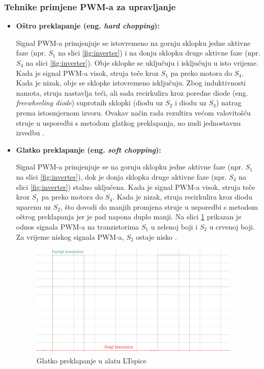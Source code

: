 \documentclass[diplomskirad]{fer}
\begin{document}
\subsubsection{Tehnike primjene PWM-a za upravljanje}
\label{sss:pwm}
\begin{itemize}

	\item \textbf{Oštro preklapanje (eng. \textit{hard chopping}):}

	      Signal PWM-a primjenjuje se istovremeno na gornju sklopku jedne aktivne faze
	      (npr. $S_1$ na slici \ref{fig:inverter}) i na donju sklopku druge aktivne faze
	      (npr. $S_4$ na slici \ref{fig:inverter}). Obje sklopke se uključuju i
	      isključuju u isto vrijeme. Kada je signal PWM-a visok, struja teče kroz $S_1$
	      pa preko motora do $S_4$. Kada je nizak, obje se sklopke istovremeno
	      isključuju. Zbog induktivnosti namota, struja nastavlja teći, ali sada
	      recirkulira kroz poredne diode (eng. \textit{freewheeling diode}) suprotnih
	      sklopki (diodu uz $S_2$ i diodu uz $S_3$) natrag prema istosmjernom izvoru.
	      Ovakav način rada rezultira većom valovitošću struje u usporedbi s metodom
	      glatkog preklapanja, no nudi jednostavnu izvedbu \cite{TI2015}.

	\item \textbf{Glatko preklapanje (eng. \textit{soft chopping}):}

	      Signal PWM-a primjenjuje se na gornju sklopku jedne aktivne faze (npr. $S_1$ na
	      slici \ref{fig:inverter}), dok je donja sklopka druge aktivne faze (npr. $S_4$
	      na slici \ref{fig:inverter}) stalno uključena. Kada je signal PWM-a visok,
	      struja teče kroz $S_1$ pa preko motora do $S_4$. Kada je nizak, struja
	      recirkulira kroz diodu uparenu uz $S_2$, što dovodi do manjih promjena struje u
	      usporedbi s metodom oštrog preklapanja jer je pad napona duplo manji. Na slici
	      \ref{fig:hard_chopping} prikazan je odnos signala PWM-a na tranzistorima $S_1$
	      u zelenoj boji i $S_2$ u crvenoj boji. Za vrijeme niskog signala PWM-a, $S_2$
	      ostaje nisko \cite{TI2015}. 
	      \begin{figure}[h!]
		      \centering
		      \includegraphics[width=0.95\textwidth]{Figures/hard_chopping1.png}
		      \caption{Glatko preklapanje u alatu LTspice}
		      \label{fig:hard_chopping}
	      \end{figure}


\end{itemize}
\end{document}

